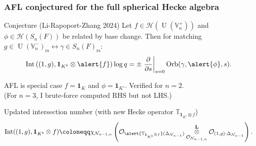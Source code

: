 \documentclass[11pt]{beamer}
\DeclareMathOperator{\Int}{Int}
\DeclareMathOperator{\Orb}{Orb}
\DeclareMathOperator{\U}{U}
\newcommand{\HH}{\mathcal{H}}
\newcommand{\VV}{\mathbb{V}}
\newcommand{\TT}{\mathbb{T}}
\newcommand{\RZ}{\mathcal{N}}
\newcommand{\Sheaf}{\mathcal O}
\newcommand{\jiao}{\mathop{\otimes}^{\mathbf{L}}} %
\newcommand{\rs}{_{\text{rs}}}
\begin{document}
\begin{frame}
  \frametitle{AFL conjectured for the full spherical Hecke algebra}
  \begin{exampleblock}{Conjecture (Li-Rapoport-Zhang 2024)}
    Let \alert{$f \in \HH(\U(\VV_n^+))$} and \alert{$\phi \in \HH(S_n(F))$}
    be \alert{related by base change}.
    Then for matching $g \in \U(\VV_n^-)\rs \longleftrightarrow \gamma \in S_n(F)\rs$:
    \[ \Int\left( (1,g), \mathbf{1}_{K^\flat} \otimes \alert{f} \right) \log q
    = \pm \left. \pdv{}{s} \right\rvert_{s=0} \Orb(\gamma, \alert{\phi}, s). \]
  \end{exampleblock}
  AFL is special case $f = \mathbf{1}_{K}$ and $\phi = \mathbf{1}_{K'}$.
  Verified for $n = 2$. \\
  (For $n=3$, I brute-force computed RHS but not LHS.)
  \begin{block}{Updated intersection number
    (with new Hecke operator $\TT_{\mathbf{1}_{K^\flat} \otimes f}$)}
    \[
      \Int((1,g), \mathbf{1}_{K^\flat} \otimes f)
      \coloneqq \chi_{\RZ_{n-1,n}} \left(
        \Sheaf_{\alert{\TT_{\mathbf{1}_{K^\flat} \otimes f}} (\Delta_{\RZ_{n-1}})}
        \jiao_{\Sheaf_{\RZ_{n-1,n}}} \Sheaf_{(1,g) \cdot \Delta_{\RZ_{n-1}}} \right).
    \]
  \end{block}
\end{frame}
\end{document}
